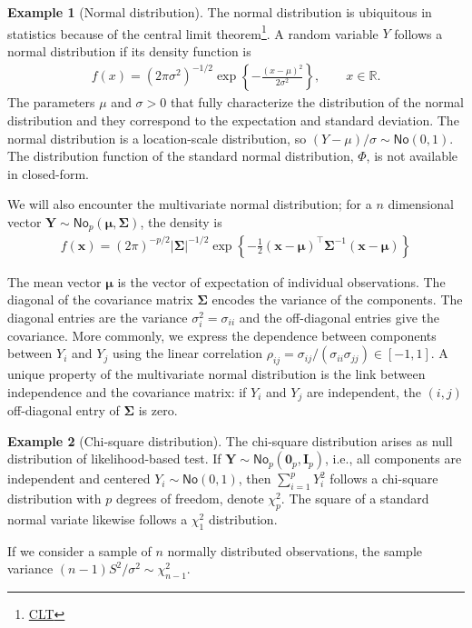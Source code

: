 \documentclass[
  11pt,
  letterpaper,
]{book}
\renewcommand{\href}[2]{#2\footnote{\url{#1}}}
\theoremstyle{definition}
\theoremstyle{definition}
\newtheorem{example}{Example}[chapter]
\theoremstyle{definition}
\theoremstyle{remark}
\begin{document}
\begin{example}[Normal distribution]
\protect\hypertarget{exm:normaldist}{}{\label{exm:normaldist} {} }The normal distribution is ubiquitous in statistics because of the \href{CLT}{central limit theorem}. A random variable \(Y\) follows a normal distribution if its density function is
\begin{align*}
f(x) = (2\pi\sigma^2)^{-1/2} \exp \left\{ - \frac{(x-\mu)^2}{2\sigma^2}\right\}, \qquad x \in \mathbb{R}.
\end{align*}
The parameters \(\mu\) and \(\sigma>0\) that fully characterize the distribution of the normal distribution and they correspond to the expectation and standard deviation. The normal distribution is a location-scale distribution, so \((Y-\mu)/\sigma \sim \mathsf{No}(0, 1)\). The distribution function of the standard normal distribution, \(\Phi\), is not available in closed-form.

We will also encounter the multivariate normal distribution; for a \(n\) dimensional vector \(\boldsymbol{Y} \sim \mathsf{No}_p(\boldsymbol{\mu}, \boldsymbol{\Sigma})\), the density is
\begin{align*}
f(\boldsymbol{x}) = (2\pi)^{-p/2} |\boldsymbol{\Sigma}|^{-1/2} \exp \left\{ - \frac{1}{2} (\boldsymbol{x}-\boldsymbol{\mu})^\top \boldsymbol{\Sigma}^{-1}(\boldsymbol{x}-\boldsymbol{\mu})\right\}
\end{align*}

The mean vector \(\boldsymbol{\mu}\) is the vector of expectation of individual observations. The diagonal of the covariance matrix \(\boldsymbol{\Sigma}\) encodes the variance of the components. The diagonal entries are the variance \(\sigma_i^2=\sigma_{ii}\) and the off-diagonal entries give the covariance. More commonly, we express the dependence between components between \(Y_i\) and \(Y_j\) using the linear correlation \(\rho_{ij}=\sigma_{ij}/(\sigma_{ii}\sigma_{jj}) \in [-1, 1]\). A unique property of the multivariate normal distribution is the link between independence and the covariance matrix: if \(Y_i\) and \(Y_j\) are independent, the \((i,j)\) off-diagonal entry of \(\boldsymbol{\Sigma}\) is zero.
\end{example}

\begin{example}[Chi-square distribution]
\protect\hypertarget{exm:chisqdist}{}{\label{exm:chisqdist} {} }The chi-square distribution arises as null distribution of likelihood-based test. If \(\boldsymbol{Y} \sim \mathsf{No}_p(\boldsymbol{0}_p, \mathbf{I}_p)\), i.e., all components are independent and centered \(Y_i \sim \mathsf{No}(0, 1)\), then \(\sum_{i=1}^p Y_i^2\) follows a chi-square distribution with \(p\) degrees of freedom, denote \(\chi^2_p\). The square of a standard normal variate likewise follows a \(\chi^2_1\) distribution.

If we consider a sample of \(n\) normally distributed observations, the sample variance \((n-1)S^2/\sigma^2 \sim \chi^2_{n-1}\).
\end{example}
\end{document}
